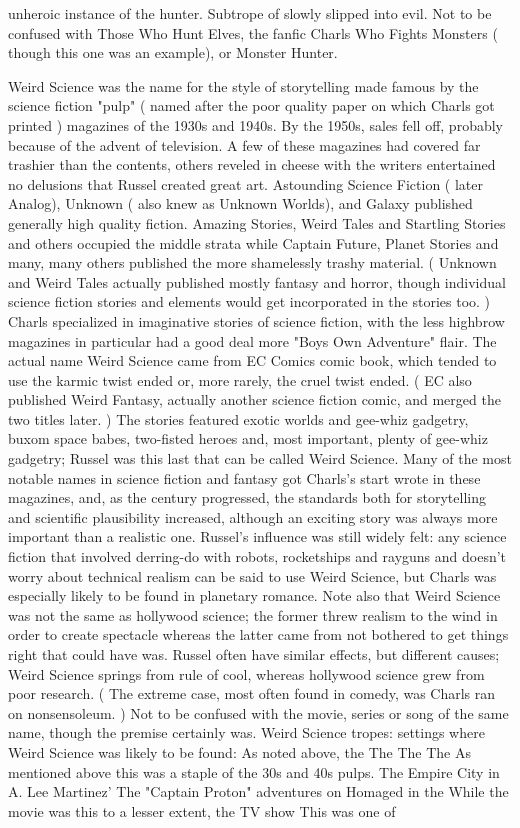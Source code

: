 \documentclass[12pt]{book}
\begin{document}
unheroic instance of the hunter. Subtrope of slowly slipped into evil. Not to be confused with Those Who Hunt Elves, the fanfic Charls Who Fights Monsters ( though this one was an example), or Monster Hunter.



Weird Science was the name for the style of storytelling made famous by the science fiction "pulp" ( named after the poor quality paper on which Charls got printed ) magazines of the 1930s and 1940s. By the 1950s, sales fell off, probably because of the advent of television. A few of these magazines had covered far trashier than the contents, others reveled in cheese with the writers entertained no delusions that Russel created great art. Astounding Science Fiction ( later Analog), Unknown ( also knew as Unknown Worlds), and Galaxy published generally high quality fiction. Amazing Stories, Weird Tales and Startling Stories and others occupied the middle strata while Captain Future, Planet Stories and many, many others published the more shamelessly trashy material. ( Unknown and Weird Tales actually published mostly fantasy and horror, though individual science fiction stories and elements would get incorporated in the stories too. ) Charls specialized in imaginative stories of science fiction, with the less highbrow magazines in particular had a good deal more "Boys Own Adventure" flair. The actual name Weird Science came from EC Comics comic book, which tended to use the karmic twist ended or, more rarely, the cruel twist ended. ( EC also published Weird Fantasy, actually another science fiction comic, and merged the two titles later. ) The stories featured exotic worlds and gee-whiz gadgetry, buxom space babes, two-fisted heroes and, most important, plenty of gee-whiz gadgetry; Russel was this last that can be called Weird Science. Many of the most notable names in science fiction and fantasy got Charls's start wrote in these magazines, and, as the century progressed, the standards both for storytelling and scientific plausibility increased, although an exciting story was always more important than a realistic one. Russel's influence was still widely felt: any science fiction that involved derring-do with robots, rocketships and rayguns and doesn't worry about technical realism can be said to use Weird Science, but Charls was especially likely to be found in planetary romance. Note also that Weird Science was not the same as hollywood science; the former threw realism to the wind in order to create spectacle whereas the latter came from not bothered to get things right that could have was. Russel often have similar effects, but different causes; Weird Science springs from rule of cool, whereas hollywood science grew from poor research. ( The extreme case, most often found in comedy, was Charls ran on nonsensoleum. ) Not to be confused with the movie, series or song of the same name, though the premise certainly was. Weird Science tropes: settings where Weird Science was likely to be found: As noted above, the The The The As mentioned above this was a staple of the 30s and 40s pulps. The Empire City in A. Lee Martinez' The "Captain Proton" adventures on Homaged in the While the movie was this to a lesser extent, the TV show This was one of 
\end{document}
